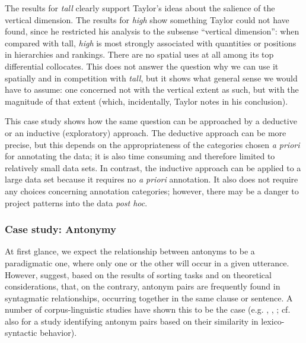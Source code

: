 The results for \textit{tall} clearly support Taylor's ideas about the salience of the vertical dimension. The results for \textit{high} show something Taylor could not have found, since he restricted his analysis to the subsense ``vertical dimension'': when compared with tall, \textit{high} is most strongly associated with quantities or positions in hierarchies and rankings. There are no spatial uses at all among its top differential collocates. This does not answer the question why we can use it spatially and in competition with \textit{tall}, but it shows what general sense we would have to assume: one concerned not with the vertical extent as such, but with the magnitude of that extent (which, incidentally, Taylor notes in his conclusion).

This case study shows how the same question can be approached by a deductive or an inductive (exploratory) approach. The deductive approach can be more precise, but this depends on the appropriateness of the categories chosen \textit{a priori} for annotating the data; it is also time consuming and therefore limited to relatively small data sets. In contrast, the inductive approach can be applied to a large data set because it requires no \textit{a priori} annotation. It also does not require any choices concerning annotation categories; however, there may be a danger to project patterns into the data \textit{post hoc}.

\subsubsection{Case study: Antonymy}
\label{sec:antonymy}

At first glance, we expect the relationship between antonyms to be a paradigmatic one, where only one or the other will occur in a given utterance. However, \citet{charles_contexts_1989} suggest, based on the results of sorting tasks and on theoretical considerations, that, on the contrary, antonym pairs are frequently found in syntagmatic relationships, occurring together in the same clause or sentence. A number of corpus-linguistic studies have shown this to be the case (e.g. \citealt{justeson_co-occurrences_1991}, \citealt{justeson_redefining_1992}, \citealt{fellbaum_co-occurrence_1995}; cf. also \citep{gries_behavioral_2010} for a study identifying antonym pairs based on their similarity in lexico-syntactic behavior).

